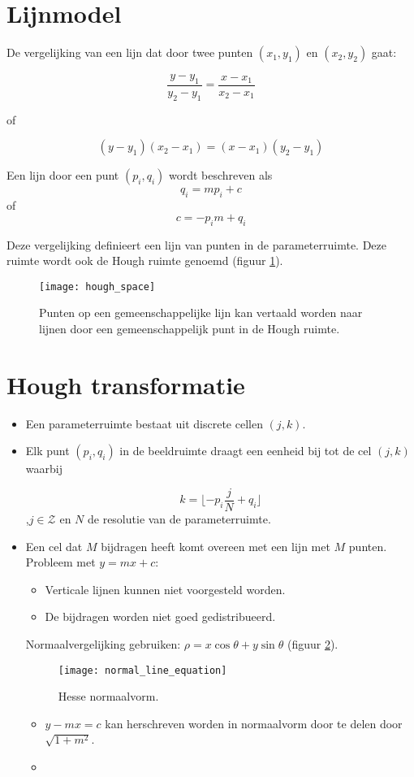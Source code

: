 \section{Lijnmodel}
De vergelijking van een lijn dat door twee punten $(x_1, y_1)$ en $(x_2, y_2)$ gaat:

$$\frac{y - y_1}{y_2 - y_1} = \frac{x - x_1}{x_2 - x_1}$$

of

$$(y - y_1)(x_2 - x_1) = (x - x_1)(y_2 - y_1)$$

Een lijn door een punt $(p_i, q_i)$ wordt beschreven als 
$$q_i = mp_i + c$$
of
$$c = -p_im + q_i$$

Deze vergelijking definieert een lijn van punten in de parameterruimte. Deze ruimte wordt ook de Hough ruimte genoemd (figuur \ref{fig:hough_space}).
\begin{figure}
	\texttt{[image: hough\_space]}
	\caption{Punten op een gemeenschappelijke lijn kan vertaald worden naar lijnen door een gemeenschappelijk punt in de Hough ruimte.}
	\label{fig:hough_space}
\end{figure}


\section{Hough transformatie}
\begin{itemize}
	\item Een parameterruimte bestaat uit discrete cellen $(j, k)$.
	\item Elk punt $(p_i, q_i)$ in de beeldruimte draagt een eenheid bij tot de cel $(j, k)$ waarbij
	
	$$k = \lfloor -p_i \frac{j}{N} + q_i \rfloor$$
	,$j \in \mathcal{Z}$ en $N$ de resolutie van de parameterruimte.
	\item Een cel dat $M$ bijdragen heeft komt overeen met een lijn met $M$ punten.
	\alert Probleem met $y = mx + c$:
	\begin{itemize}
		\item Verticale lijnen kunnen niet voorgesteld worden.
		\item De bijdragen worden niet goed gedistribueerd.
	\end{itemize}
	\good Normaalvergelijking gebruiken: $\rho = x\cos\theta + y\sin\theta$ (figuur \ref{fig:normal_line_equation}).
	\begin{figure}
		\centering
		\texttt{[image: normal\_line\_equation]}
		\caption{Hesse normaalvorm.}
		\label{fig:normal_line_equation}
	\end{figure}
	\begin{itemize}
		\item $y - mx = c$ kan herschreven worden in normaalvorm door te delen door $\sqrt{1 + m^2}$.
		\item 
	\end{itemize}
\end{itemize}

